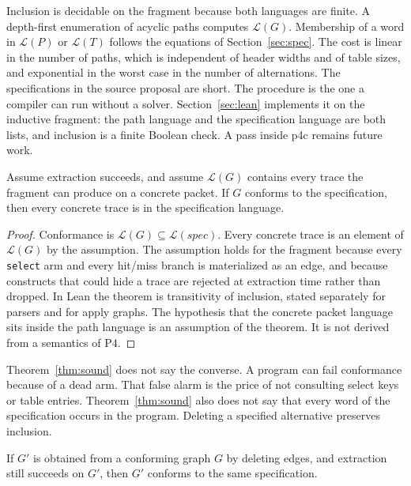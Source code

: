 \documentclass[a4paper,UKenglish,cleveref,autoref]{lipics-v2021}
\begin{document}
Inclusion is decidable on the fragment because both languages are finite.
A depth-first enumeration of acyclic paths computes \(\mathcal{L}(G)\).
Membership of a word in \(\mathcal{L}(P)\) or \(\mathcal{L}(T)\) follows the equations of Section~\ref{sec:spec}.
The cost is linear in the number of paths, which is independent of header widths and of table sizes, and exponential in the worst case in the number of alternations.
The specifications in the source proposal are short.
The procedure is the one a compiler can run without a solver.
Section~\ref{sec:lean} implements it on the inductive fragment: the path language and the specification language are both lists, and inclusion is a finite Boolean check.
A pass inside p4c remains future work.

\begin{theorem}
\label{thm:sound}
Assume extraction succeeds, and assume \(\mathcal{L}(G)\) contains every trace the fragment can produce on a concrete packet.
If \(G\) conforms to the specification, then every concrete trace is in the specification language.
\end{theorem}

\begin{proof}
Conformance is \(\mathcal{L}(G) \subseteq \mathcal{L}(\mathit{spec})\).
Every concrete trace is an element of \(\mathcal{L}(G)\) by the assumption.
The assumption holds for the fragment because every \texttt{select} arm and every hit/miss branch is materialized as an edge, and because constructs that could hide a trace are rejected at extraction time rather than dropped.
In Lean the theorem is transitivity of inclusion, stated separately for parsers and for apply graphs.
The hypothesis that the concrete packet language sits inside the path language is an assumption of the theorem.
It is not derived from a semantics of P4.
\end{proof}

Theorem~\ref{thm:sound} does not say the converse.
A program can fail conformance because of a dead arm.
That false alarm is the price of not consulting select keys or table entries.
Theorem~\ref{thm:sound} also does not say that every word of the specification occurs in the program.
Deleting a specified alternative preserves inclusion.

\begin{proposition}
\label{prop:mono}
If \(G'\) is obtained from a conforming graph \(G\) by deleting edges, and extraction still succeeds on \(G'\), then \(G'\) conforms to the same specification.
\end{proposition}
\end{document}
